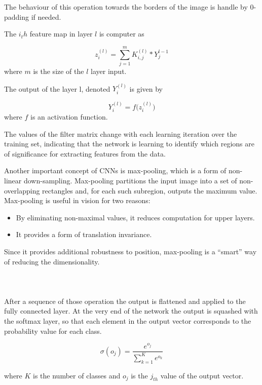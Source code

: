 The behaviour of this operation towards the borders of the image is handle by 0-padding if needed. 

The $i_th$ feature map in layer $l$ is computer as  

\begin{equation}
z_{i}^{(l)} = \sum_{j=1}^{m} K_{i,j}^{(l)} \ast Y_{j}^{l-1}
\end{equation}
where $m$ is the size of the $l$ layer input.

The output of the layer l, denoted $Y_{i}^{(l)}$ is given by

\begin{equation}
Y_{i}^{(l)} = f\Big(z_{i}^{(l)}\Big)
\end{equation}
where $f$ is an activation function.

The values of the filter matrix change with each learning iteration over the training set, indicating that the network is learning to identify which regions are of significance for extracting features from the data. 

Another important concept of CNNs is max-pooling, which is a form of non-linear down-sampling. Max-pooling partitions the input image into a set of non- overlapping rectangles and, for each such subregion, outputs the maximum value.
Max-pooling is useful in vision for two reasons: 

\begin{itemize}
\itemsep0em 
\item By eliminating non-maximal values, it reduces computation for upper layers.
\item It provides a form of translation invariance.
\end{itemize}

Since it provides additional robustness to position, max-pooling is a “smart” way of reducing the dimensionality.
\\\\\\\\
After a sequence of those operation the output is flattened and applied to the fully connected layer.
At the very end of the network the output is squashed with the softmax layer, so that each element in the output vector corresponds to the probability value for each class.

\begin{equation}
\sigma(o_{j}) = \frac{e^{o_{j}}}{\sum_{k=1}^{K} e^{o_{k}}}
\end{equation}

where $K$ is the number of classes and $o_{j}$ is the $j_{th}$ value of the output vector.


